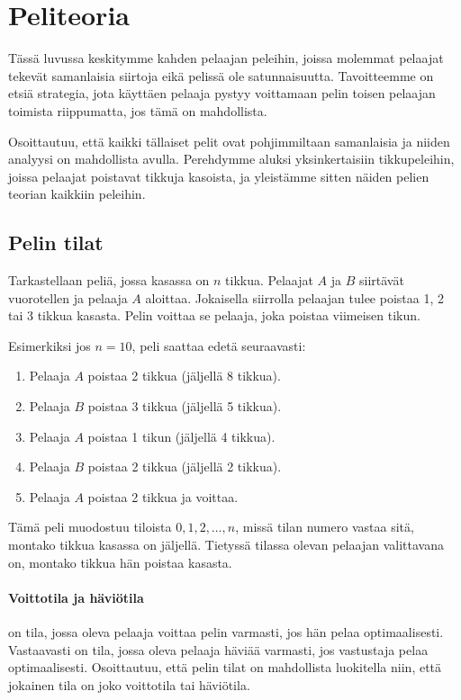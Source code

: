 \chapter{Peliteoria}

Tässä luvussa keskitymme kahden pelaajan peleihin,
joissa molemmat pelaajat tekevät
samanlaisia siirtoja eikä pelissä ole satunnaisuutta.
Tavoitteemme on etsiä strategia, jota käyttäen
pelaaja pystyy voittamaan pelin toisen pelaajan
toimista riippumatta, jos tämä on mahdollista.

Osoittautuu, että kaikki tällaiset pelit ovat
pohjimmiltaan samanlaisia ja niiden analyysi on
mahdollista  avulla.
Perehdymme aluksi yksinkertaisiin tikkupeleihin,
joissa pelaajat poistavat tikkuja kasoista,
ja yleistämme sitten näiden pelien teorian kaikkiin peleihin.

\section{Pelin tilat}

Tarkastellaan peliä, jossa kasassa on $n$ tikkua.
Pelaajat $A$ ja $B$ siirtävät vuorotellen ja
pelaaja $A$ aloittaa.
Jokaisella siirrolla pelaajan tulee poistaa
1, 2 tai 3 tikkua kasasta.
Pelin voittaa se pelaaja, joka poistaa viimeisen tikun.

Esimerkiksi jos $n=10$, peli saattaa edetä seuraavasti:
\begin{enumerate}[noitemsep]
\item Pelaaja $A$ poistaa 2 tikkua (jäljellä 8 tikkua).
\item Pelaaja $B$ poistaa 3 tikkua (jäljellä 5 tikkua).
\item Pelaaja $A$ poistaa 1 tikun (jäljellä 4 tikkua).
\item Pelaaja $B$ poistaa 2 tikkua (jäljellä 2 tikkua).
\item Pelaaja $A$ poistaa 2 tikkua ja voittaa.
\end{enumerate}
Tämä peli muodostuu tiloista $0,1,2,\ldots,n$,
missä tilan numero vastaa sitä, montako tikkua
kasassa on jäljellä.
Tietyssä tilassa olevan pelaajan valittavana on,
montako tikkua hän poistaa kasasta.

\subsubsection{Voittotila ja häviötila}


 on tila, jossa oleva pelaaja voittaa
pelin varmasti, jos hän pelaa optimaalisesti.
Vastaavasti  on tila,
jossa oleva pelaaja häviää varmasti, jos vastustaja
pelaa optimaalisesti.
Osoittautuu, että pelin tilat on mahdollista luokitella
niin, että jokainen tila on joko voittotila tai häviötila.


